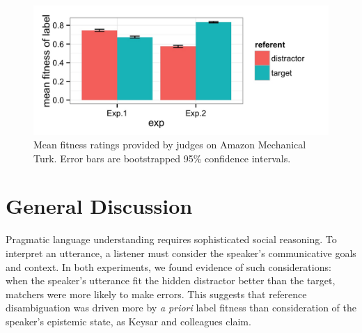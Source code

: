 \documentclass[10pt,letterpaper]{article}
\begin{document}

\begin{figure}[t!]
\begin{center}
\includegraphics[scale=.18]{images/fitnessInteraction.jpeg}
\caption{Mean fitness ratings provided by judges on Amazon Mechanical Turk. Error bars are bootstrapped 95\% confidence intervals.}
\label{fig:fitnessInteraction}
\end{center}
\end{figure}


\section{General Discussion}

Pragmatic language understanding requires sophisticated social reasoning. To interpret an utterance, a listener must consider the speaker's communicative goals and context. In both experiments, we found evidence of such considerations: when the speaker's utterance fit the hidden distractor better than the target, matchers were more likely to make errors. This suggests that reference disambiguation was driven more by \emph{a priori} label fitness than consideration of the speaker's epistemic state, as Keysar and colleagues claim. 
\end{document}
